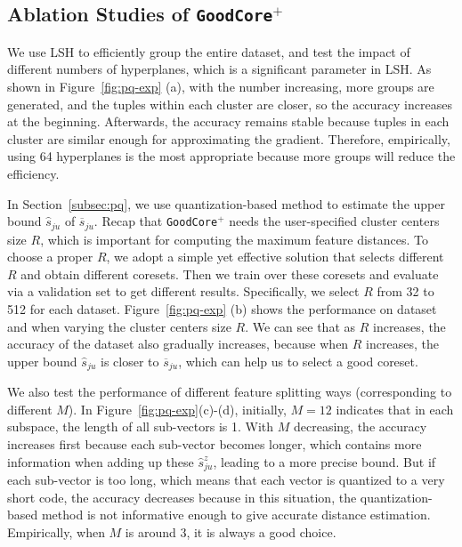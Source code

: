 
\subsection{Ablation Studies of \texttt{GoodCore}$^+$}
We use LSH to efficiently group the entire dataset, and test the impact of  different numbers of hyperplanes, which is a significant parameter in LSH.
 As shown in Figure~\ref{fig:pq-exp} (a), with the number increasing, more groups are generated, and the tuples within each cluster are closer, so the  accuracy increases at the beginning. Afterwards, the accuracy remains stable because tuples in each cluster are similar enough for  approximating the gradient. Therefore, empirically, using  64 hyperplanes is the most appropriate because more groups will reduce the efficiency.

 In Section~\ref{subsec:pq}, we use quantization-based method to estimate the upper bound $\hat{s}_{ju}$ of $\overline{s}_{ju}$. Recap that \texttt{GoodCore}$^+$ needs the user-specified cluster centers size $R$, which is important for computing the maximum feature distances.
%
 To choose a proper $R$, we adopt a simple yet effective solution that selects different $R$ and obtain different coresets. Then we train over these coresets and evaluate via a validation set to get different results. Specifically, we select $R$ from 32 to 512 for each dataset. Figure~\ref{fig:pq-exp} (b) shows the performance on dataset \hr and \imdbl when varying the cluster centers size $R$.  We can see that as $R$ increases, the accuracy of the dataset also gradually increases, because when $R$ increases, the upper bound $\hat{s}_{ju}$ is closer to $\overline{s}_{ju}$, which can help us to select a good coreset.


We also test the performance of different feature splitting ways (corresponding to different $M$). In Figure~\ref{fig:pq-exp}(c)-(d), initially,  $M=12$ indicates that in each subspace, the length of all sub-vectors is 1. With $M$ decreasing, the accuracy increases first because each sub-vector becomes longer, which contains more information when adding up these $\hat{s}^z_{ju}$, leading to a more precise bound. But if each sub-vector is too long, which means that each vector is quantized to a very short code, the accuracy decreases because in this situation, the quantization-based method is not informative enough to give accurate  distance estimation. Empirically, when $M$ is around 3, it is always a good choice.
